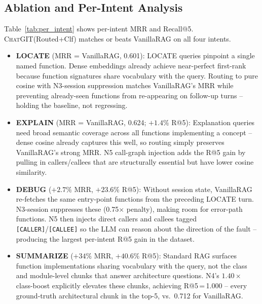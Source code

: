 \documentclass[conference]{IEEEtran}
\newcommand{\chatgit}{\textsc{ChatGIT}\xspace}
\begin{document}
\subsection{Ablation and Per-Intent Analysis}

Table~\ref{tab:per_intent} shows per-intent MRR and Recall@5.
\chatgit (Routed+Clf) matches or beats VanillaRAG on all four intents.

\begin{itemize}
  \item \textbf{LOCATE} (MRR = VanillaRAG, 0.601): LOCATE queries pinpoint a
        single named function. Dense embeddings already achieve near-perfect
        first-rank because function signatures share vocabulary with the
        query. Routing to pure cosine with N3-session suppression matches
        VanillaRAG's MRR while preventing already-seen functions from
        re-appearing on follow-up turns -- holding the baseline, not regressing.

  \item \textbf{EXPLAIN} (MRR = VanillaRAG, 0.624; $+1.4\%$ R@5): Explanation queries
        need broad semantic coverage across all functions implementing a
        concept -- dense cosine already captures this well, so routing simply
        preserves VanillaRAG's strong MRR. N5 call-graph injection adds the
        R@5 gain by pulling in callers/callees that are structurally essential
        but have lower cosine similarity.

   \item \textbf{DEBUG} ($+2.7\%$  MRR, $+23.6\%$ R@5): Without session
        state, VanillaRAG re-fetches the same entry-point functions from
        the preceding LOCATE turn. N3-session suppresses these (0.75$\times$
        penalty), making room for error-path functions. N5 then injects
        direct callers and callees tagged \texttt{[CALLER]}/\texttt{[CALLEE]}
        so the LLM can reason about the direction of the fault -- producing
        the largest per-intent R@5 gain in the dataset.

  \item \textbf{SUMMARIZE} ($+34\%$ MRR, $+40.6\%$ R@5): Standard RAG
        surfaces function implementations sharing vocabulary with the query,
        not the class and module-level chunks that answer architecture
        questions. N4's $1.40\times$ class-boost explicitly elevates these
        chunks, achieving R@5\,=\,1.000 -- every ground-truth architectural
        chunk in the top-5, vs.\ 0.712 for VanillaRAG.
\end{itemize}
\end{document}
